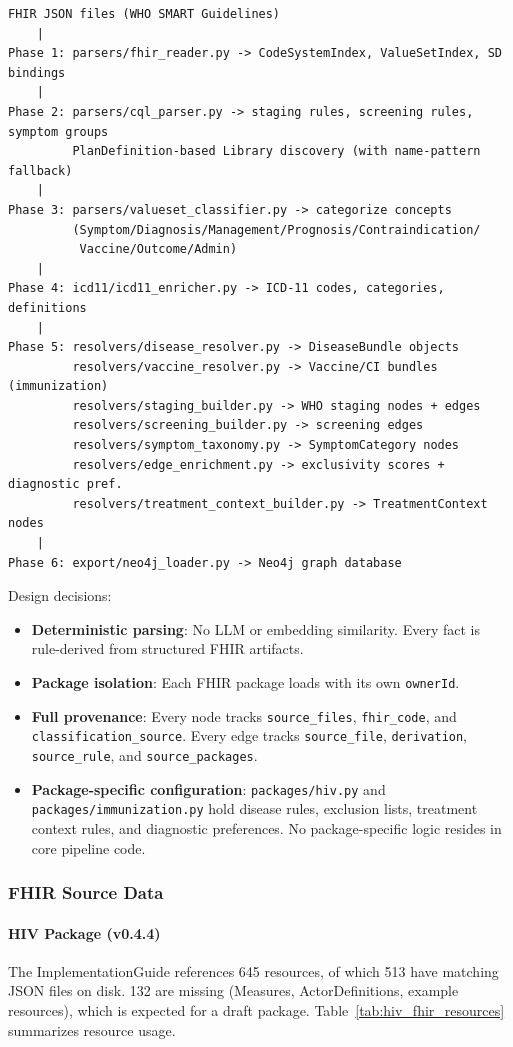 \begin{verbatim}
FHIR JSON files (WHO SMART Guidelines)
    |
Phase 1: parsers/fhir_reader.py -> CodeSystemIndex, ValueSetIndex, SD bindings
    |
Phase 2: parsers/cql_parser.py -> staging rules, screening rules, symptom groups
         PlanDefinition-based Library discovery (with name-pattern fallback)
    |
Phase 3: parsers/valueset_classifier.py -> categorize concepts
         (Symptom/Diagnosis/Management/Prognosis/Contraindication/
          Vaccine/Outcome/Admin)
    |
Phase 4: icd11/icd11_enricher.py -> ICD-11 codes, categories, definitions
    |
Phase 5: resolvers/disease_resolver.py -> DiseaseBundle objects
         resolvers/vaccine_resolver.py -> Vaccine/CI bundles (immunization)
         resolvers/staging_builder.py -> WHO staging nodes + edges
         resolvers/screening_builder.py -> screening edges
         resolvers/symptom_taxonomy.py -> SymptomCategory nodes
         resolvers/edge_enrichment.py -> exclusivity scores + diagnostic pref.
         resolvers/treatment_context_builder.py -> TreatmentContext nodes
    |
Phase 6: export/neo4j_loader.py -> Neo4j graph database
\end{verbatim}

Design decisions:
\begin{itemize}
    \item \textbf{Deterministic parsing}: No LLM or embedding similarity. Every fact is rule-derived from structured FHIR artifacts.
    \item \textbf{Package isolation}: Each FHIR package loads with its own \texttt{ownerId}.
    \item \textbf{Full provenance}: Every node tracks \texttt{source\_files}, \texttt{fhir\_code}, and \texttt{classification\_source}. Every edge tracks \texttt{source\_file}, \texttt{derivation}, \texttt{source\_rule}, and \texttt{source\_packages}.
    \item \textbf{Package-specific configuration}: \texttt{packages/hiv.py} and \texttt{packages/immunization.py} hold disease rules, exclusion lists, treatment context rules, and diagnostic preferences. No package-specific logic resides in core pipeline code.
\end{itemize}

\subsubsection{FHIR Source Data}

\paragraph{HIV Package (v0.4.4)}
The ImplementationGuide references 645 resources, of which 513 have matching JSON files on disk. 132 are missing (Measures, ActorDefinitions, example resources), which is expected for a draft package. Table~\ref{tab:hiv_fhir_resources} summarizes resource usage.

